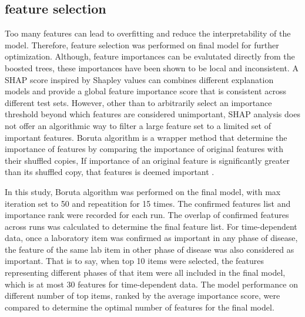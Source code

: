 \documentclass[final,3p,times,authoryear]{elsarticle}
\begin{document}
\subsection{feature selection}\label{FeatureSelection}

Too many features can lead to overfitting and reduce the interpretability of the model. Therefore, feature selection was performed on final model for further optimization. Although, feature importances can be evalutated directly from the boosted trees, these importances have been shown to be local and inconsistent. A SHAP score inspired by Shapley values can combines different explanation models and provide a global feature importance score that is consistent across different test sets. However, other than to arbitrarily select an importance threshold beyond which features are considered unimportant, SHAP analysis does not offer an algorithmic way to filter a large feature set to a limited set of important features. Boruta algorithm is a wrapper method that determine the importance of features by comparing the importance of original features with their shuffled copies, If importance of an original feature is significantly greater than its shuffled copy, that features is deemed important \citep{kursa2010feature}.

In this study, Boruta algorithm was performed on the final model, with max iteration set to 50 and repeatition for 15 times. The confirmed features list and importance rank were recorded for each run. The overlap of confirmed features across runs was calculated to determine the final feature list. For time-dependent data, once a laboratory item was confirmed as important in any phase of disease, the feature of the same lab item in other phase of disease was also considered as important. That is to say, when top 10 items were selected, the features representing different phases of that item were all included in the final model, which is at most 30 features for time-dependent data. The model performance on different number of top items, ranked by the average importance score, were compared to determine the optimal number of features for the final model.
\end{document}
